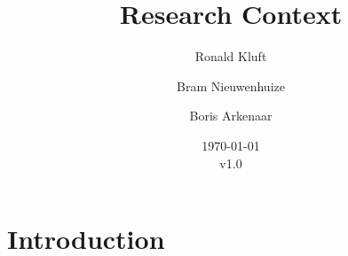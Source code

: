 \documentclass{article}
\begin{document}
 

\title{Research Context}
\author{Ronald Kluft \and Bram Nieuwenhuize \and Boris Arkenaar}
\date{\today\\v1.0}
\maketitle 

\section{Introduction}

	 



\end{document}
